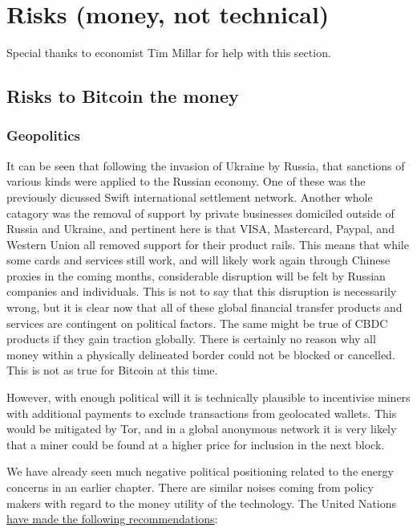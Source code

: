 \section{Risks (money, not technical)}
Special thanks to economist Tim Millar for help with this section.
\subsection{Risks to Bitcoin the money}
\subsubsection{Geopolitics}
It can be seen that following the invasion of Ukraine by Russia, that sanctions of various kinds were applied to the Russian economy. One of these was the previously dicussed Swift international settlement network. Another whole catagory was the removal of support by private businesses domiciled outside of Russia and Ukraine, and pertinent here is that VISA, Mastercard, Paypal, and Western Union all removed support for their product rails. This means that while some cards and services still work, and will likely work again through Chinese proxies in the coming months, considerable disruption will be felt by Russian companies and individuals. This is not to say that this disruption is necessarily wrong, but it is clear now that all of these global financial transfer products and services are contingent on political factors. The same might be true of CBDC products if they gain traction globally. There is certainly no reason why all money within a physically delineated border could not be blocked or cancelled. This is not as true for Bitcoin at this time. \par 
However, with enough political will it is technically plausible to incentivise miners with additional payments to exclude transactions from geolocated wallets. This would be mitigated by Tor, and in a global anonymous network it is very likely that a miner could be found at a higher price for inclusion in the next block. \par
We have already seen much negative political positioning related to the energy concerns in an earlier chapter. There are similar noises coming from policy makers with regard to the money utility of the technology. The United Nations \href{https://unctad.org/system/files/official-document/presspb2022d8_en.pdf}{have made the following recommendations}:
